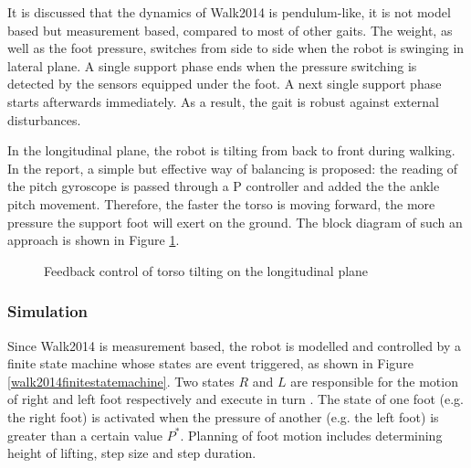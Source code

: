 It is discussed that the dynamics of Walk2014 is pendulum-like, it is not model based but measurement based\cite{BHumanCodeRelease2017}, compared to most of other gaits. The weight, as well as the foot pressure, switches from side to side when the robot is swinging in lateral plane. A single support phase ends when the pressure switching is detected by the sensors equipped under the foot. A next single support phase starts afterwards immediately. As a result, the gait is robust against external disturbances.

In the longitudinal plane, the robot is tilting from back to front during walking. In the report\cite{hengst2014runswift}, a simple but effective way of balancing is proposed: the reading of the pitch gyroscope is passed through a P controller and added the the ankle pitch movement. Therefore, the faster the torso is moving forward, the more pressure the support foot will exert on the ground. The block diagram of such an approach is shown in Figure {\ref{walk2014feedbacklong}}.

\begin{figure}[H]
	\centering
	\caption{Feedback control of torso tilting on the longitudinal plane}
	\label{walk2014feedbacklong}
\end{figure}

\subsubsection{Simulation}
Since Walk2014 is measurement based, the robot is modelled and controlled by a finite state machine whose states are event triggered, as shown in Figure {\ref{walk2014finitestatemachine}}. Two states $ R $ and $ L $ are responsible for the motion of right and left foot respectively and execute in turn . The state of one foot (e.g. the right foot) is activated when the pressure of another (e.g. the left foot) is greater than a certain value $ P^{*} $. Planning of foot motion includes determining height of lifting, step size and step duration.

